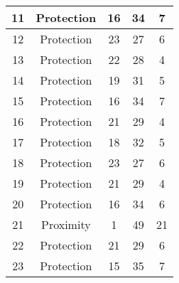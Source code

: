 \documentclass[results.tex]{subfiles}
\begin{document}
\begin{center}
\begin{tabular}{| c || c | c | c | c |}
            \hline
            11                      & Protection                   & 16                     & 34                      & 7                    \\
            \hline
            12                      & Protection                   & 23                     & 27                      & 6                    \\
            \hline
            13                      & Protection                   & 22                     & 28                      & 4                    \\
            \hline
            14                      & Protection                   & 19                     & 31                      & 5                    \\
            \hline
            15                      & Protection                   & 16                     & 34                      & 7                    \\
            \hline
            16                      & Protection                   & 21                     & 29                      & 4                    \\
            \hline
            17                      & Protection                   & 18                     & 32                      & 5                    \\
            \hline
            18                      & Protection                   & 23                     & 27                      & 6                    \\
            \hline
            19                      & Protection                   & 21                     & 29                      & 4                    \\
            \hline
            20                      & Protection                   & 16                     & 34                      & 6                    \\
            \hline
            21                      & Proximity                    & 1                      & 49                      & 21                   \\
            \hline
            22                      & Protection                   & 21                     & 29                      & 6                    \\
            \hline
            23                      & Protection                   & 15                     & 35                      & 7                    \\

\end{tabular}
\end{center}
\end{document}

